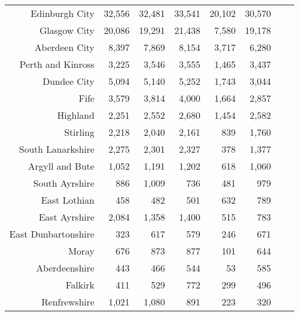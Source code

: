 \documentclass[
  12pt,
]{article}
\begin{document}
\begin{longtable}[t]{rrrrrrrr}
\endfoot
\bottomrule
\endlastfoot
Edinburgh City & 32,556 & 32,481 & 33,541 & 20,102 & 30,570 & \cellcolor{white}{  52.1\%} & \cellcolor{white}{ -1.6\%}\\
Glasgow City & 20,086 & 19,291 & 21,438 & 7,580 & 19,178 & \cellcolor{white}{ 153.0\%} & \cellcolor{white}{ -1.1\%}\\
Aberdeen City & 8,397 & 7,869 & 8,154 & 3,717 & 6,280 & \cellcolor{white}{  69.0\%} & \cellcolor{white}{ -7.0\%}\\
Perth and Kinross & 3,225 & 3,546 & 3,555 & 1,465 & 3,437 & \cellcolor{white}{ 134.6\%} & \cellcolor{white}{  1.6\%}\\
Dundee City & 5,094 & 5,140 & 5,252 & 1,743 & 3,044 & \cellcolor{white}{  74.6\%} & \cellcolor{white}{-12.1\%}\\
Fife & 3,579 & 3,814 & 4,000 & 1,664 & 2,857 & \cellcolor{white}{  71.7\%} & \cellcolor{white}{ -5.5\%}\\
Highland & 2,251 & 2,552 & 2,680 & 1,454 & 2,582 & \cellcolor{white}{  77.6\%} & \cellcolor{white}{  3.5\%}\\
Stirling & 2,218 & 2,040 & 2,161 & 839 & 1,760 & \cellcolor{white}{ 109.8\%} & \cellcolor{white}{ -5.6\%}\\
South Lanarkshire & 2,275 & 2,301 & 2,327 & 378 & 1,377 & \cellcolor{white}{ 264.3\%} & \cellcolor{white}{-11.8\%}\\
Argyll and Bute & 1,052 & 1,191 & 1,202 & 618 & 1,060 & \cellcolor{white}{  71.5\%} & \cellcolor{white}{  0.2\%}\\
South Ayrshire & 886 & 1,009 & 736 & 481 & 979 & \cellcolor{white}{ 103.5\%} & \cellcolor{white}{  2.5\%}\\
East Lothian & 458 & 482 & 501 & 632 & 789 & \cellcolor{white}{  24.8\%} & \cellcolor{white}{ 14.6\%}\\
East Ayrshire & 2,084 & 1,358 & 1,400 & 515 & 783 & \cellcolor{white}{  52.0\%} & \cellcolor{white}{-21.7\%}\\
East Dunbartonshire & 323 & 617 & 579 & 246 & 671 & \cellcolor{white}{ 172.8\%} & \cellcolor{white}{ 20.1\%}\\
Moray & 676 & 873 & 877 & 101 & 644 & \cellcolor{white}{ 537.6\%} & \cellcolor{white}{ -1.2\%}\\
Aberdeenshire & 443 & 466 & 544 & 53 & 585 & \cellcolor{white}{1003.8\%} & \cellcolor{white}{  7.2\%}\\
Falkirk & 411 & 529 & 772 & 299 & 496 & \cellcolor{white}{  65.9\%} & \cellcolor{white}{  4.8\%}\\
Renfrewshire & 1,021 & 1,080 & 891 & 223 & 320 & \cellcolor{white}{  43.5\%} & \cellcolor{white}{-25.2\%}\\

\end{longtable}
\end{document}
